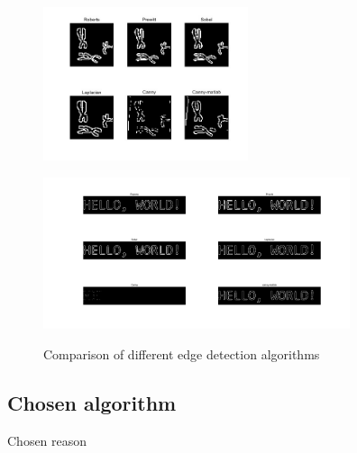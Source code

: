 \documentclass[hyperref]{article}
\theoremstyle{nonumberplain}
\begin{document}
	\begin{figure}[h]
		\centering
		\begin{minipage}[t]{0.35\textwidth}
			\centering
			\includegraphics[width=6cm]{fig16a.jpg}
			\label{fig16a}
		\end{minipage}
		\begin{minipage}[t]{0.48\textwidth}
			\centering
			\includegraphics[width=9cm]{fig16b.jpg}
			\label{fig16b}
		\end{minipage}
		\caption{Comparison of different edge detection algorithms}
		\label{fig16}
	\end{figure}
	
	
%	
%	

	
	\subsection{Chosen algorithm}
	
	\hspace{1.0em}
	Chosen reason
	
\end{document}

